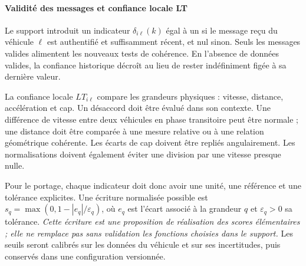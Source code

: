 \paragraph{Validité des messages et confiance locale LT}
Le support introduit un indicateur $\delta_{i\ell}(k)$ égal à un si le message reçu du véhicule $\ell$ est authentifié et suffisamment récent, et nul sinon. Seuls les messages valides alimentent les nouveaux tests de cohérence. En l'absence de données valides, la confiance historique décroît au lieu de rester indéfiniment figée à sa dernière valeur.

La confiance locale $LT_{i\ell}$ compare les grandeurs physiques : vitesse, distance, accélération et cap. Un désaccord doit être évalué dans son contexte. Une différence de vitesse entre deux véhicules en phase transitoire peut être normale ; une distance doit être comparée à une mesure relative ou à une relation géométrique cohérente. Les écarts de cap doivent être repliés angulairement. Les normalisations doivent également éviter une division par une vitesse presque nulle.

Pour le portage, chaque indicateur doit donc avoir une unité, une référence et une tolérance explicites. Une écriture normalisée possible est $s_q=\max(0,1-|e_q|/\varepsilon_q)$, où $e_q$ est l'écart associé à la grandeur $q$ et $\varepsilon_q>0$ sa tolérance. \emph{Cette écriture est une proposition de réalisation des scores élémentaires ; elle ne remplace pas sans validation les fonctions choisies dans le support.} Les seuils seront calibrés sur les données du véhicule et sur ses incertitudes, puis conservés dans une configuration versionnée.

